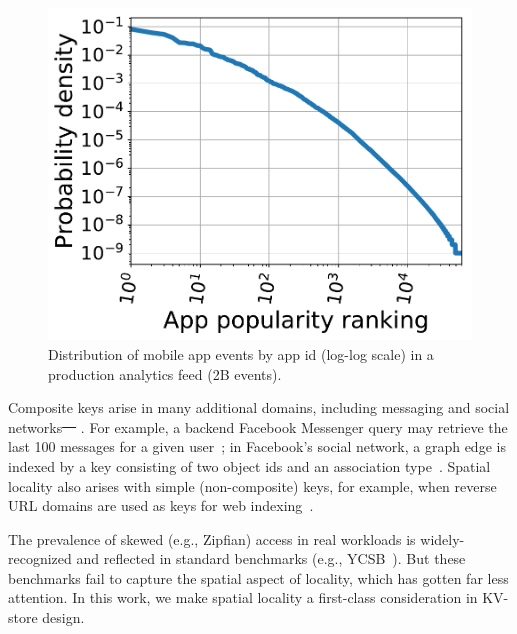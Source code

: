 \documentclass[sigplan,10pt]{acmart}
\providecommand{\DIFdel}[1]{{\protect\color{red}\sout{#1}}}                      %
\providecommand{\DIFdelbegin}{} %
\providecommand{\DIFdelend}{} %
\begin{document}
\begin{figure}[tb]
\centering
\includegraphics[width=0.6\columnwidth]{figs/app_names_loglog_line.pdf}
\caption{{Distribution of mobile app events by app id (log-log scale) in a production analytics feed (2B events).}}
\label{fig:cdf}
\end{figure}

Composite keys arise in many additional domains, including messaging and social networks\DIFdelbegin \DIFdel{~\mbox{%
\cite{facebook-workloads}}\hspace{0pt}%
}\DIFdelend . 
For example, a backend Facebook Messenger query may retrieve the last 100 messages for a 
given user~\cite{Borthakur:2011:AHG:1989323.1989438}; %
in Facebook's social network, a graph edge is indexed by a key consisting of two 
object ids and an association type~\cite{Armstrong:2013:LDB:2463676.2465296}.
Spatial locality   also arises with simple (non-composite) keys, for example, when 
reverse  URL domains are used as keys for web  indexing~\cite{Cho:1998:ECT:297805.297835}. 

The prevalence of skewed (e.g., Zipfian)  access  in real workloads is widely-recognized 
and reflected in standard benchmarks (e.g., YCSB~\cite{YCSB}). %
But these benchmarks fail to capture the spatial aspect of locality, which has gotten far less attention.
In this work, we make spatial locality a first-class consideration in KV-store design.
\end{document}
